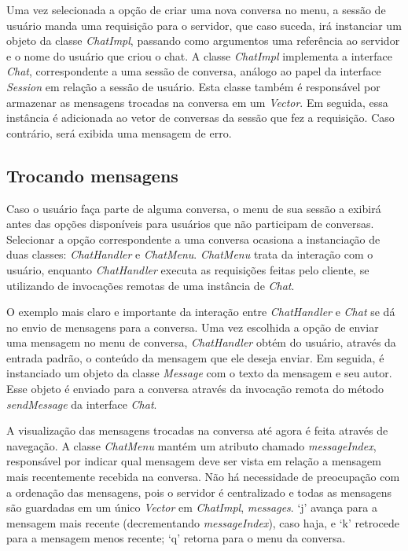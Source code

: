 \documentclass[../main.tex]{subfiles}
\begin{document}
Uma vez selecionada a opção de criar uma nova conversa no menu, a sessão de usuário manda uma requisição para o servidor, que caso suceda, irá instanciar um objeto da classe \textit{ChatImpl}, passando como argumentos uma referência ao servidor e o nome do usuário que criou o chat.
A classe \textit{ChatImpl} implementa a interface \textit{Chat}, correspondente a uma sessão de conversa, análogo ao papel da interface \textit{Session} em relação a sessão de usuário.
Esta classe também é responsável por armazenar as mensagens trocadas na conversa em um \textit{Vector}.
Em seguida, essa instância é adicionada ao vetor de conversas da sessão que fez a requisição.
Caso contrário, será exibida uma mensagem de erro.

\subsection{Trocando mensagens}

Caso o usuário faça parte de alguma conversa, o menu de sua sessão a exibirá antes das opções disponíveis para usuários que não participam de conversas.
Selecionar a opção correspondente a uma conversa ocasiona a instanciação de duas classes: \textit{ChatHandler} e \textit{ChatMenu}.
\textit{ChatMenu} trata da interação com o usuário, enquanto \textit{ChatHandler} executa as requisições feitas pelo cliente, se utilizando de invocações remotas de uma instância de \textit{Chat}.

O exemplo mais claro e importante da interação entre \textit{ChatHandler} e \textit{Chat} se dá no envio de mensagens para a conversa.
Uma vez escolhida a opção de enviar uma mensagem no menu de conversa, \textit{ChatHandler} obtém do usuário, através da entrada padrão, o conteúdo da mensagem que ele deseja enviar.
Em seguida, é instanciado um objeto da classe \textit{Message} com o texto da mensagem e seu autor.
Esse objeto é enviado para a conversa através da invocação remota do método \textit{sendMessage} da interface \textit{Chat}.

A visualização das mensagens trocadas na conversa até agora é feita através de navegação.
A classe \textit{ChatMenu} mantém um atributo chamado \textit{messageIndex}, responsável por indicar qual mensagem deve ser vista em relação a mensagem mais recentemente recebida na conversa.
Não há necessidade de preocupação com a ordenação das mensagens, pois o servidor é centralizado e todas as mensagens são guardadas em um único \textit{Vector} em \textit{ChatImpl}, \textit{messages}.
`j' avança para a mensagem mais recente (decrementando \textit{messageIndex}), caso haja, e `k' retrocede para a mensagem menos recente; `q' retorna para o menu da conversa.
\end{document}
